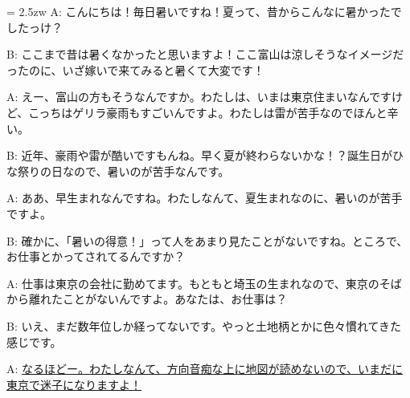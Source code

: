 \documentclass[11pt]{amsart}
\title{}
\author{}
\newenvironment{hangall}[1]{\hangindent = 2.5zw\everypar{\hangindent = 2.5zw}}{}
\begin{document}
\maketitle
\begin{hangall}{}%
A: こんにちは！毎日暑いですね！夏って、昔からこんなに暑かったでしたっけ？

B: ここまで昔は暑くなかったと思いますよ！ここ富山は涼しそうなイメージだったのに、いざ嫁いで来てみると暑くて大変です！

A: えー、富山の方もそうなんですか。わたしは、いまは東京住まいなんですけど、こっちはゲリラ豪雨もすごいんですよ。わたしは雷が苦手なのでほんと辛い。

B: 近年、豪雨や雷が酷いですもんね。早く夏が終わらないかな！？誕生日がひな祭りの日なので、暑いのが苦手なんです。

A: ああ、早生まれなんですね。わたしなんて、夏生まれなのに、暑いのが苦手ですよ。

B: 確かに、「暑いの得意！」って人をあまり見たことがないですね。ところで、お仕事とかってされてるんですか？

A: 仕事は東京の会社に勤めてます。もともと埼玉の生まれなので、東京のそばから離れたことがないんですよ。あなたは、お仕事は？

B: いえ、まだ数年位しか経ってないです。やっと土地柄とかに色々慣れてきた感じです。

A: \ul{なるほどー。わたしなんて、方向音痴な上に地図が読めないので、いまだに東京で迷子になりますよ！}\end{hangall}
\end{document}
